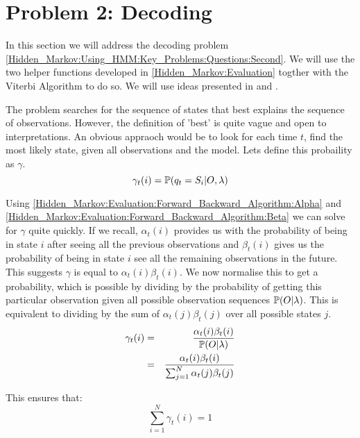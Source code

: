 \section{Problem 2: Decoding}
\label{Hidden_Markov:Decoding}

    In this section we will address the decoding problem \ref{Hidden_Markov:Using_HMM:Key_Problems:Questions:Second}. We will use the two helper functions developed in \ref{Hidden_Markov:Evaluation} togther with the Viterbi Algorithm to do so. We will use ideas presented in \cite{Rabiner1986} and \cite{Forney1973}.

    The problem searches for the sequence of states that best explains the sequence of observations. However, the definition of 'best' is quite vague and open to interpretations. An obvious appraoch would be to look for each time $t$, find the most likely state, given all observations and the model. Lets define this probaility as $\gamma$.
    \begin{equation}
        \label{Hidden_Markov:Decoding:gamma}
        \gamma_t(i) = \mathbb{P} (q_t = S_i | O, \lambda)
    \end{equation}

    Using \ref{Hidden_Markov:Evaluation:Forward_Backward_Algorithm:Alpha} and \ref{Hidden_Markov:Evaluation:Forward_Backward_Algorithm:Beta} we can solve for $\gamma$ quite quickly. If we recall, $\alpha_t(i)$ provides us with the probability of being in state $i$ after seeing all the previous observations and $\beta_t(i)$ gives us the probability of being in state $i$ see all the remaining observations in the future. This suggests $\gamma$ is equal to $\alpha_t(i) \beta_t(i)$. We now normalise this to get a probability, which is possible by dividing by the probability of getting this particular observation given all possible observation sequences $\mathbb{P} (O|\lambda)$. This is equivalent to dividing by the sum of $\alpha_t(j) \beta_t(j)$ over all possible states $j$.
    \begin{eqnarray}
        \gamma_t(i) & = &  \dfrac{\alpha_t(i) \beta_t(i)}{\mathbb{P} (O|\lambda)} \\
                    & = &  \dfrac{\alpha_t(i) \beta_t(i)}{\sum_{j=1}^N \alpha_t(j) \beta_t(j)}
    \end{eqnarray}


    This ensures that:
    \begin{equation}
        \sum_{i=1}^N \gamma_t(i) = 1
    \end{equation}

